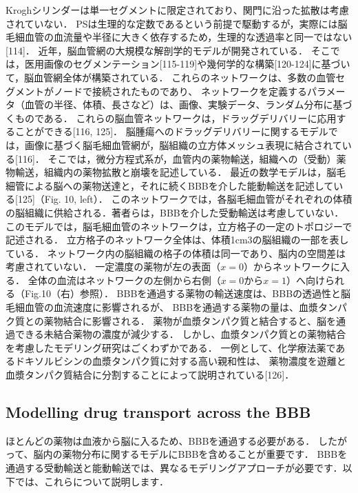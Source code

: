 \documentclass[11pt,a4paper]{jsarticle}
\begin{document}
Kroghシリンダーは単一セグメントに限定されており、関門に沿った拡散は考慮されていない．
PSは生理的な定数であるという前提で駆動するが，実際には脳毛細血管の血流量や半径に大きく依存するため，生理的な透過率と同一ではない[114]．
近年，脳血管網の大規模な解剖学的モデルが開発されている．
そこでは，医用画像のセグメンテーション[115-119]や幾何学的な構築[120-124]に基づいて，脳血管網全体が構築されている．
これらのネットワークは、多数の血管セグメントがノードで接続されたものであり、
ネットワークを定義するパラメータ（血管の半径、体積、長さなど）は、画像、実験データ、ランダム分布に基づくものである．
これらの脳血管ネットワークは，ドラッグデリバリーに応用することができる[116, 125]．
脳腫瘍へのドラッグデリバリーに関するモデルでは，画像に基づく脳毛細血管網が，脳組織の立方体メッシュ表現に結合されている[116]．
そこでは，微分方程式系が，血管内の薬物輸送，組織への（受動）薬物輸送，組織内の薬物拡散と崩壊を記述している．
最近の数学モデルは，脳毛細管による脳への薬物送達と，それに続くBBBを介した能動輸送を記述している[125]（Fig. 10, left）．
このネットワークでは，各脳毛細血管がそれぞれの体積の脳組織に供給される．著者らは，BBBを介した受動輸送は考慮していない．
このモデルでは，脳毛細血管のネットワークは，立方格子の一定のトポロジーで記述される．
立方格子のネットワーク全体は、体積1cm3の脳組織の一部を表している．
ネットワーク内の脳組織の格子の体積は同一であり、脳内の空間差は考慮されていない．
一定濃度の薬物が左の表面（$x = 0$）からネットワークに入る．
全体の血流はネットワークの左側から右側（$x = 0$から$x = 1$）へ向けられる（Fig.10（右）参照）．
BBBを通過する薬物の輸送速度は、BBBの透過性と脳毛細血管の血流速度に影響されるが、
BBBを通過する薬物の量は、血漿タンパク質との薬物結合に影響される．
薬物が血漿タンパク質と結合すると、脳を通過できる未結合薬物の濃度が減少する．
しかし、血漿タンパク質との薬物結合を考慮したモデリング研究はごくわずかである．
一例として、化学療法薬であるドキソルビシンの血漿タンパク質に対する高い親和性は、
薬物濃度を遊離と血漿タンパク質結合に分割することによって説明されている[126]．
\subsection{Modelling drug transport across the BBB}
ほとんどの薬物は血液から脳に入るため、BBBを通過する必要がある．
したがって、脳内の薬物分布に関するモデルにBBBを含めることが重要です．
BBBを通過する受動輸送と能動輸送では、異なるモデリングアプローチが必要です．以下では、これらについて説明します．
\end{document}
